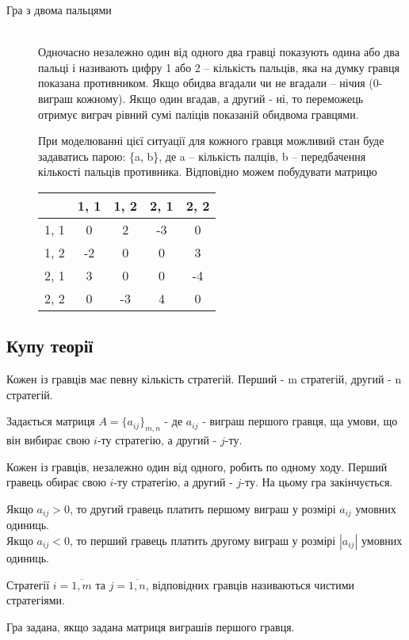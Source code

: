 \documentclass[12pt,a4paper]{article}
\begin{document}
\begin{description}
\item[Гра з двома пальцями] \hfill \\
Одночасно незалежно один від одного два гравці показують одина або два пальці і називають цифру 1 або 2 -- кількість пальців, яка на думку гравця показана противником. Якщо обидва вгадали чи не вгадали -- нічия (0-виграш кожному). Якщо один вгадав, а другий - ні, то переможець отримує виграч рівний сумі паліців показаній обидвома гравцями.

При моделюванні цієї ситуації для кожного гравця можливий стан буде задаватись парою: \{a, b\}, де a -- кількість палців, b -- передбачення кількості пальців противника.
Відповідно можем побудувати матрицю

\begin{tabular}{ r | c | c | c | c | }
         & 1, 1 & 1, 2 & 2, 1 & 2, 2 \\ \hline
  1, 1 & 0 & 2 & -3 & 0 \\ \hline
  1, 2 & -2 & 0 & 0 & 3 \\ \hline
  2, 1 & 3 & 0 & 0 & -4 \\ \hline
  2, 2 & 0 & -3 & 4 & 0 \\ \hline
\end{tabular}

\end{description}

\subsection*{Купу теорії}
Кожен із гравців має певну кількість стратегій. Перший - m стратегій, другий - n стратегій.

Задається матриця $A=\{a_{ij}\}_{m, n}$ - де $a_{ij}$ - виграш першого гравця, ща умови, що він вибирає свою $i$-ту стратегію, а другий - $j$-ту.

Кожен із гравців, незалежно один від одного, робить по одному ходу. Перший гравець обирає свою $i$-ту стратегію, а другий - $j$-ту. На цьому гра закінчується.

Якщо $a_{ij}>0$, то другий гравець платить першому виграш у розмірі $a_{ij}$ умовних одиниць.\\
Якщо $a_{ij}<0$, то перший гравець платить другому виграш у розмірі $|a_{ij}|$ умовних одиниць.

Стратегії $i=\overline{1, m}$ та $j=\overline{1, n}$, відповідних гравців називаються чистими стратегіями.

Гра задана, якщо задана матриця виграшів першого гравця.
\end{document}
